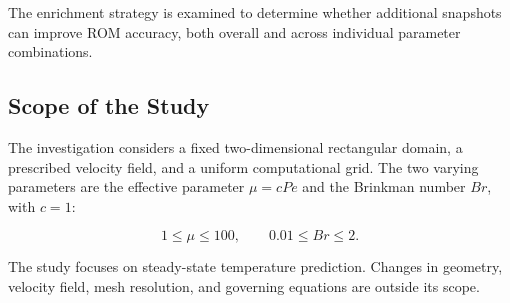 The enrichment strategy is examined to determine whether additional snapshots can improve ROM accuracy, both overall and across individual parameter combinations.

\subsection{Scope of the Study}

The investigation considers a fixed two-dimensional rectangular domain, a prescribed velocity field, and a uniform computational grid. The two varying parameters are the effective parameter $\mu=cPe$ and the Brinkman number $Br$, with $c=1$:

\begin{equation}
    1 \leq \mu \leq 100,
    \qquad
    0.01 \leq Br \leq 2.
\end{equation}

The study focuses on steady-state temperature prediction. Changes in geometry, velocity field, mesh resolution, and governing equations are outside its scope.